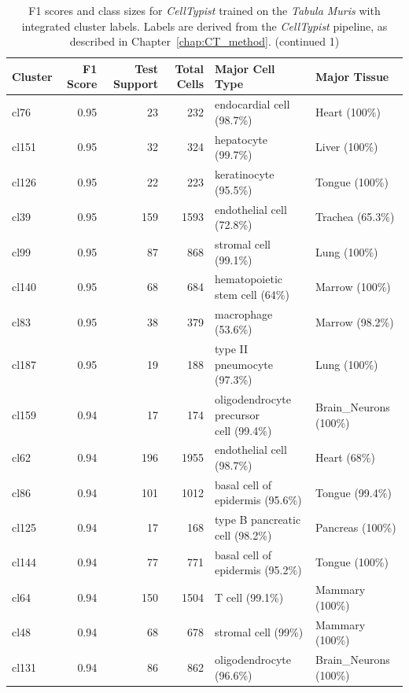 \begin{table}[ht!]
\scriptsize
\caption[F1 scores and class sizes for \textit{CellTypist} trained on the \textit{Tabula Muris} with integrated cluster labels (continued 1)]{F1 scores and class sizes for \textit{CellTypist} trained on the \textit{Tabula Muris} with integrated cluster labels. Labels are derived from the \textit{CellTypist} pipeline, as described in Chapter~\ref{chap:CT_method}. (continued 1)}
\centering
\label{table:tab_tmmodelclust1}
\begin{tabular}{lrrrll}
  \toprule
Cluster & F1 Score & Test Support & Total Cells & Major Cell Type & Major Tissue \\
  \midrule
  cl76 & 0.95 &  23 & 232 & endocardial cell (98.7\%) & Heart (100\%) \\ 
  cl151 & 0.95 &  32 & 324 & hepatocyte (99.7\%) & Liver (100\%) \\ 
  cl126 & 0.95 &  22 & 223 & keratinocyte (95.5\%) & Tongue (100\%) \\ 
  cl39 & 0.95 & 159 & 1593 & endothelial cell (72.8\%) & Trachea (65.3\%) \\ 
  cl99 & 0.95 &  87 & 868 & stromal cell (99.1\%) & Lung (100\%) \\ 
  cl140 & 0.95 &  68 & 684 & hematopoietic stem cell (64\%) & Marrow (100\%) \\ 
  cl83 & 0.95 &  38 & 379 & macrophage (53.6\%) & Marrow (98.2\%) \\ 
  cl187 & 0.95 &  19 & 188 & type II pneumocyte (97.3\%) & Lung (100\%) \\ 
  cl159 & 0.94 &  17 & 174 & \specialcell[t]{oligodendrocyte precursor\\cell (99.4\%)} & Brain\_Neurons (100\%) \\ 
  cl62 & 0.94 & 196 & 1955 & endothelial cell (98.7\%) & Heart (68\%) \\ 
  cl86 & 0.94 & 101 & 1012 & basal cell of epidermis (95.6\%) & Tongue (99.4\%) \\ 
  cl125 & 0.94 &  17 & 168 & type B pancreatic cell (98.2\%) & Pancreas (100\%) \\ 
  cl144 & 0.94 &  77 & 771 & basal cell of epidermis (95.2\%) & Tongue (100\%) \\ 
  cl64 & 0.94 & 150 & 1504 & T cell (99.1\%) & Mammary (100\%) \\ 
  cl48 & 0.94 &  68 & 678 & stromal cell (99\%) & Mammary (100\%) \\ 
  cl131 & 0.94 &  86 & 862 & oligodendrocyte (96.6\%) & Brain\_Neurons (100\%) \\ 

\end{tabular}
\end{table}
